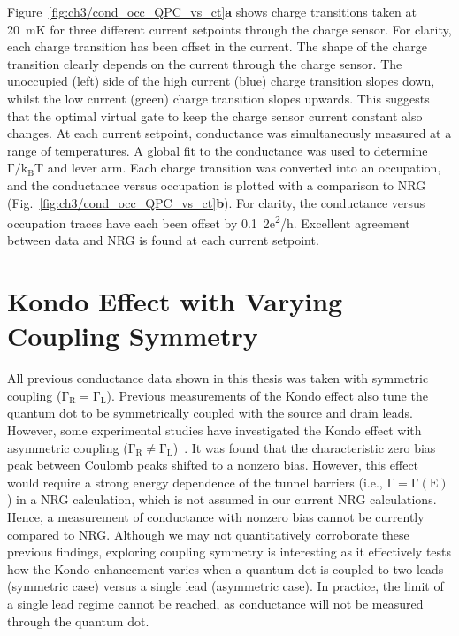 Figure~\ref{fig:ch3/cond_occ_QPC_vs_ct}\textbf{a} shows charge transitions taken at \qty{20}{mK} for three different current setpoints through the charge sensor. For clarity, each charge transition has been offset in the current. The shape of the charge transition clearly depends on the current through the charge sensor. The unoccupied (left) side of the high current (blue) charge transition slopes down, whilst the low current (green) charge transition slopes upwards. This suggests that the optimal virtual gate to keep the charge sensor current constant also changes. At each current setpoint, conductance was simultaneously measured at a range of temperatures. A global fit to the conductance was used to determine $\mathrm{\Gamma/k_BT}$ and lever arm. Each charge transition was converted into an occupation, and the conductance versus occupation is plotted with a comparison to NRG (Fig.~\ref{fig:ch3/cond_occ_QPC_vs_ct}\textbf{b}). For clarity, the conductance versus occupation traces have each been offset by \qty{0.1}{2e^2/h}. Excellent agreement between data and NRG is found at each current setpoint. 


\section{Kondo Effect with Varying Coupling Symmetry}

All previous conductance data shown in this thesis was taken with symmetric coupling ($\mathrm{\Gamma_R = \Gamma_L}$). Previous measurements of the Kondo effect also tune the quantum dot to be symmetrically coupled with the source and drain leads. However, some experimental studies have investigated the Kondo effect with asymmetric coupling ($\mathrm{\Gamma_R \neq \Gamma_L}$)~\cite{kondo_asymmetric}. It was found that the characteristic zero bias peak between Coulomb peaks shifted to a nonzero bias. However, this effect would require a strong energy dependence of the tunnel barriers (i.e., $\mathrm{\Gamma = \Gamma(E)}$) in a NRG calculation, which is not assumed in our current NRG calculations.
Hence, a measurement of conductance with nonzero bias cannot be currently compared to NRG. 
Although we may not quantitatively corroborate these previous findings, exploring coupling symmetry is interesting as it effectively tests how the Kondo enhancement varies when a quantum dot is coupled to two leads (symmetric case) versus a single lead (asymmetric case). In practice, the limit of a single lead regime cannot be reached, as conductance will not be measured through the quantum dot.


